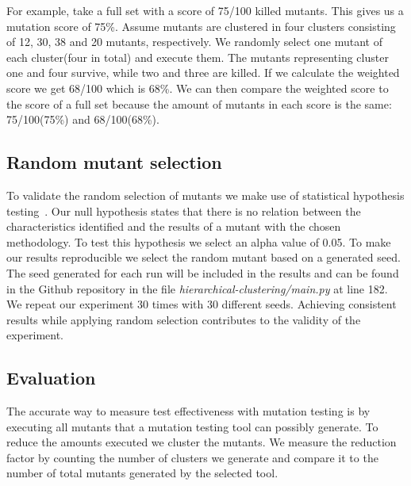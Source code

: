 \documentclass[conference,draftclsnofoot,onecolumn]{IEEEtran}
\begin{document}
For example, take a full set with a score of 75/100 killed mutants. This gives us a mutation score of 75\%. 
Assume mutants are clustered in four clusters consisting of 12, 30, 38 and 20 mutants, respectively.
We randomly select one mutant of each cluster(four in total) and execute them. The mutants representing cluster one and four survive, while two and three are killed.
If we calculate the weighted score we get 68/100 which is 68\%. We can then compare the weighted score to the score of a full set because the amount of mutants in each score is the same: 75/100(75\%) and 68/100(68\%).

\subsection{Random mutant selection}
\label{ch:mutant_selection}
To validate the random selection of mutants we make use of statistical hypothesis testing~\cite{Emmert-Streib2019UnderstandingInference}. Our null hypothesis states that there is no relation between the characteristics identified and the results of a mutant with the chosen methodology.
To test this hypothesis we select an alpha value of 0.05.
To make our results reproducible we select the random mutant based on a generated seed.
The seed generated for each run will be included in the results and can be found in the Github repository in the file \textit{hierarchical-clustering/main.py} at line 182\cite{rbasarat-repo}.
We repeat our experiment 30 times with 30 different seeds.
Achieving consistent results while applying random selection contributes to the validity of the experiment.

\subsection{Evaluation}
\label{ch:exp1_validation}
The accurate way to measure test effectiveness with mutation testing is by executing all mutants that a mutation testing tool can possibly generate.
To reduce the amounts executed we cluster the mutants. 
We measure the reduction factor by counting the number of clusters we generate and compare it to the number of total mutants generated by the selected tool.
\end{document}
